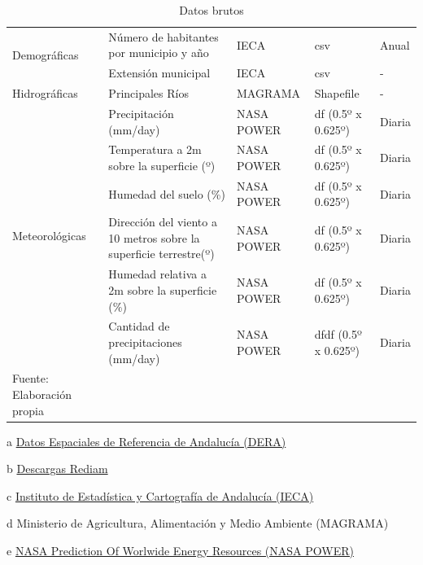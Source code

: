 \documentclass[12pt,a4paper,]{book}
\numberwithin{dummy}{section}
\theoremstyle{ocrenumbox}
\theoremstyle{blacknumex}
\theoremstyle{blacknumbox}
\theoremstyle{ocrenum}
\theoremstyle{ocrenum}
\begin{document}
\begin{table}
\begin{threeparttable}[]
{\begin{tabular}{lllll}
\multirow{2}{*}{Demográficas}   & Número de habitantes por municipio y año                       & IECA\tnote{c}       & csv                & Anual      \\
                                & Extensión municipal                                            & IECA\tnote{c}       & csv                & -      \\ \hline
Hidrográficas                   & Principales Ríos                                               & MAGRAMA\tnote{d}    & Shapefile          & -          \\ \hline
\multirow{6}{*}{Meteorológicas} & Precipitación (mm/day)                                         & NASA POWER\tnote{e} & df (0.5º x 0.625º) & Diaria     \\
                                & Temperatura a 2m sobre la superficie (º)                       & NASA POWER & df (0.5º x 0.625º) & Diaria     \\
                                & Humedad del suelo (\%)                                         & NASA POWER & df (0.5º x 0.625º) & Diaria     \\
                                & Dirección del viento a 10 metros sobre la superficie terrestre(º) & NASA POWER & df (0.5º x 0.625º) & Diaria     \\
                                & Humedad relativa a 2m sobre la superficie (\%)                 & NASA POWER & df (0.5º x 0.625º) & Diaria     \\
                                & Cantidad de precipitaciones (mm/day)                           & NASA POWER & dfdf (0.5º x 0.625º) & Diaria     \\ \hline
\footnotesize Fuente: Elaboración propia
\end{tabular}}
\begin{tablenotes}
\raggedright
\item[a] {\footnotesize \href{https://www.juntadeandalucia.es/institutodeestadisticaycartografia/dega/datos-espaciales-de-referencia-de-andalucia-dera/descarga-de-informacion}{Datos Espaciales de Referencia de Andalucía (DERA)}}
\item[b] {\footnotesize \href{https://portalrediam.cica.es/descargas?path=%2F}{Descargas Rediam}}%
\item[c] {\footnotesize \href{https://www.juntadeandalucia.es/institutodeestadisticaycartografia/dega/}{Instituto de Estadística y Cartografía de Andalucía (IECA)}}
\item[d] {\footnotesize Ministerio de Agricultura, Alimentación y Medio Ambiente (MAGRAMA)}
\item[e] {\footnotesize \href{https://power.larc.nasa.gov/#resources}{NASA Prediction Of Worlwide Energy Resources (NASA POWER)}}
\end{tablenotes}
\caption{Datos brutos}
\label{tab:fuentes}
\end{threeparttable}
\end{table}
\end{document}

